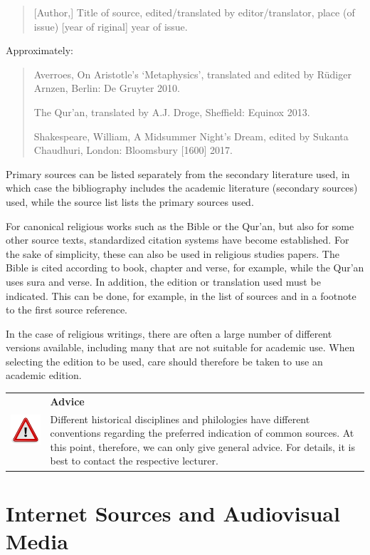 \documentclass[
  english,
]{scrreprt}
\newlength{\iconwidth}
\newenvironment{displaybox}[2]{%
    \begin{center}
        \setlength\arrayrulewidth{0.75pt}%
        \arrayrulecolor{white}%
        \renewcommand{\arraystretch}{1.3}%
        \begin{tabular}{p{\iconwidth}p{\linewidth-4\tabcolsep-\iconwidth}}
            \multirow{2}{*}{#2}&\cellcolor{boxheadcol}\textbf{\sffamily\color{white}#1} \\%
            \hhline{~-}%
            &\cellcolor{boxcol}%
}{%
            \\
        \end{tabular}
        \arrayrulecolor{black}
    \end{center}
}
\newenvironment{Advice}{%
\begin{displaybox}{Advice}{\includegraphics[width=\iconwidth]{images/icon-hinweis}}}%
{\end{displaybox}}
\begin{document}
\begin{quote}
{[}Author,{]} Title of source, edited/\hspace{0pt}translated by editor/\hspace{0pt}translator, place (of issue) {[}year of riginal{]} year of issue.
\end{quote}

Approximately:

\begin{quote}
Averroes, On Aristotle’s ‘Metaphysics’, translated and edited by Rüdiger Arnzen, Berlin: De Gruyter 2010.

The Qur’an, translated by A.J. Droge, Sheffield: Equinox 2013.

Shakespeare, William, A Midsummer Night’s Dream, edited by Sukanta Chaudhuri, London: Bloomsbury {[}1600{]} 2017.
\end{quote}

Primary sources can be listed separately from the secondary literature used, in which case the bibliography includes the academic literature (secondary sources) used, while the source list lists the primary sources used.

For canonical religious works such as the Bible or the Qur’an, but also for some other source texts, standardized citation systems have become established. For the sake of simplicity, these can also be used in religious studies papers. The Bible is cited according to book, chapter and verse, for example, while the Qur’an uses sura and verse. In addition, the edition or translation used must be indicated. This can be done, for example, in the list of sources and in a footnote to the first source reference.

In the case of religious writings, there are often a large number of different versions available, including many that are not suitable for academic use. When selecting the edition to be used, care should therefore be taken to use an academic edition.

\begin{Advice}

Different historical disciplines and philologies have different conventions regarding the preferred indication of common sources. At this point, therefore, we can only give general advice. For details, it is best to contact the respective lecturer.

\end{Advice}

\section{Internet Sources and Audiovisual Media}\label{internet-sources-and-audiovisual-media}
\end{document}
